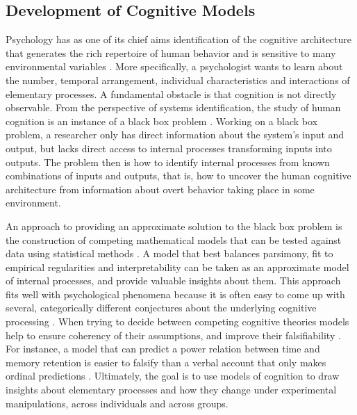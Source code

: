 \documentclass[12pt]{article}
\begin{document}
\subsection{Development of Cognitive Models}

Psychology has as one of its chief aims identification of the cognitive
architecture that generates the rich repertoire of human behavior and is
sensitive to many environmental variables \citep{AndBot2004,And2007}. More
specifically, a psychologist wants to learn about the number, temporal
arrangement, individual characteristics and interactions of elementary
processes. A fundamental obstacle is
that cognition is not directly observable. From the perspective of systems
identification, the study of human cognition is an instance of a black box
problem \citep{Lju1999, Lju2010}. Working on a black box problem, a
researcher only has direct information about the system's input and
output, but lacks direct access to internal processes transforming inputs
into outputs. The problem then is how to identify internal processes from
known combinations of inputs and outputs, that is, how to uncover the human
cognitive architecture from information about overt behavior taking place
in some environment.

An approach to providing an approximate solution to the black box problem
is the construction of competing mathematical models that can be
tested against data using statistical methods
\citep{Lju1999,Lju2010,CasBer2002,GelCar2013}. A model that best balances
parsimony, fit to empirical regularities and interpretability can be taken
as an approximate model of internal processes, and provide valuable insights
about them. This approach fits well with psychological
phenomena because it is often easy to come up with several, categorically
different conjectures about the underlying cognitive processing
\citep{TowAsh1983}. When trying to decide between competing cognitive theories models help to ensure coherency of their assumptions, and improve their falsifiability
\citep{BusDie2010,LewFar2010,LeeWag2014}. For instance, a model that can
predict a power relation between time and memory retention is easier to
falsify than a verbal account that only makes ordinal predictions
\citep{CavMyu2013}. Ultimately, the goal is to use models of cognition to
draw insights about elementary processes and how they change under
experimental manipulations, across individuals and across groups.
\end{document}
